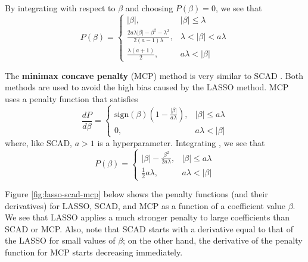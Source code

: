 \documentclass{article}
\newcommand{\sign}{\text{sign}}
\begin{document}
By integrating with respect to $\beta$ \cite{breheny2016lasso} and choosing $P(\beta) = 0$, we see that
\begin{equation}
	P(\beta) = \left\{\begin{array}{ll}
		\vert \beta \vert,&\vert \beta \vert \leq \lambda\\
		\frac{2a\lambda\vert\beta\vert - \beta^2-\lambda^2}{2(a - 1)\lambda},&\lambda < \vert \beta \vert < a\lambda\\
		\frac{\lambda(a + 1)}{2},&a\lambda < \vert \beta \vert
	\end{array}\right.
\end{equation}

The \textbf{minimax concave penalty} (MCP) method is very similar to SCAD \cite{zhang2010nearly, breheny2016lasso}. Both methods are used to avoid the high bias caused by the LASSO method. MCP uses a penalty function that satisfies
\begin{equation}
	\frac{dP}{d\beta} = \left\{\begin{array}{ll}
		\sign(\beta)\left(1 - \frac{\vert \beta \vert}{a\lambda}\right),& \vert \beta \vert \leq a\lambda\\
		0,&a\lambda < \vert \beta \vert
	\end{array}\right.
\end{equation}
where, like SCAD, $a>1$ is a hyperparameter. Integrating \cite{breheny2016lasso}, we see that
\begin{equation}
	P(\beta) = \left\{\begin{array}{ll}
		\vert \beta \vert - \frac{\beta^2}{2a\lambda},&\vert \beta \vert \leq a\lambda\\
		\frac{1}{2}a\lambda,&a\lambda < \vert \beta \vert
	\end{array}\right.
\end{equation}

Figure \ref{fig:lasso-scad-mcp} below shows the penalty functions (and their derivatives) for LASSO, SCAD, and MCP as a function of a coefficient value $\beta$. We see that LASSO applies a much stronger penalty to large coefficients than SCAD or MCP. Also, note that SCAD starts with a derivative equal to that of the LASSO for small values of $\beta$; on the other hand, the derivative of the penalty function for MCP starts decreasing immediately.
\end{document}
